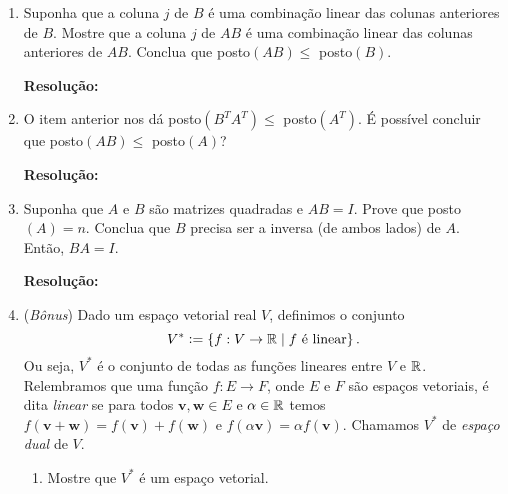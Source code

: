 \documentclass[leqno]{article}
\numberwithin{equation}{section}
\newcommand{\bfw}{\mathbf{w}}
\newcommand{\bfv}{\mathbf{v}}
\newenvironment{sol}
{
    \vspace{4mm}
    \noindent\textbf{Resolução:}
    \strut\newline
    \smallskip
    \hspace{-3.5mm}
}
{}
\begin{document}
\begin{enumerate}
    \item Suponha que a coluna $j$ de $B$ é uma combinação linear das colunas anteriores de $B$. Mostre que a coluna $j$ de $AB$ é uma combinação linear das colunas anteriores de $AB$. Conclua que posto$(AB) \leq $ posto$(B)$.

        \begin{sol} 
        \end{sol} 

    \item O item anterior nos dá posto$(B^T A^T) \leq $ posto$(A^T)$. É possível concluir que posto$(AB) \leq $ posto$(A)$?

        \begin{sol} 
        \end{sol} 

    \item Suponha que $A$ e $B$ são matrizes quadradas e $AB = I$. Prove que posto$(A) = n$. Conclua que $B$ precisa ser a inversa (de ambos lados) de $A$. Então, $BA = I$.

        \begin{sol} 
        \end{sol} 

    \item (\textit{Bônus}) Dado um espaço vetorial real \( V \), definimos o conjunto
        \begin{equation*}
            V^{ * } \vcentcolon= \left\{ f : V \to \mathbb{R} \mid f \text{ é linear} \right\}
        .\end{equation*}
        Ou seja, \( V^{ * } \) é o conjunto de todas as funções lineares entre \( V \) e \( \mathbb{R} \).
        Relembramos que uma função \( f : E \to F \), onde \( E \) e \( F \) são espaços vetoriais, é dita \textit{linear} se para todos \( \bfv, \bfw \in E \) e \( \alpha \in \mathbb{R} \) temos \( f ( \bfv + \bfw ) = f ( \bfv ) + f ( \bfw ) \) e \( f ( \alpha \bfv ) = \alpha f ( \bfv ) \).
        Chamamos \( V^{ * } \) de \textit{espaço dual} de \( V \).
        \begin{enumerate}
            \item Mostre que \( V^{ * } \) é um espaço vetorial.


\end{enumerate}
\end{enumerate}
\end{document}
